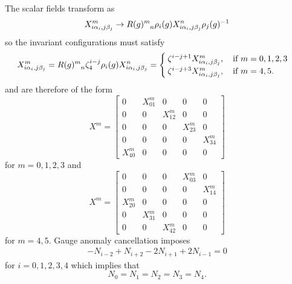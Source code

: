             The scalar fields transform as
            \begin{equation}
                X^m_{i\alpha_i,j\beta_j}\to R(g)\indices{^m_n}\rho_i(g)X^n_{i\alpha_i,j\beta_j}\rho_j(g)^{-1}
            \end{equation}
            so the invariant configurations must satisfy
            \begin{equation}
                X^m_{i\alpha_i,j\beta_j} = R(g)\indices{^m_n}\zeta^{i-j}_4\rho_i(g)X^n_{i\alpha_i,j\beta_j} = 
                \begin{cases}
                    \zeta^{i-j+1}X^m_{i\alpha_i,j\beta_j},\quad\text{if } m=0,1,2,3\\
                    \zeta^{i-j+3}X^m_{i\alpha_i,j\beta_j},\quad\text{if } m=4,5.
                \end{cases}
            \end{equation}
            and are therefore of the form
            \begin{equation}
                X^m = 
                \begin{bmatrix}
                    0 & X^m_{01} & 0 & 0 & 0\\
                    0 & 0 & X^m_{12} & 0 & 0\\
                    0 & 0 & 0 & X^m_{23} & 0\\
                    0 & 0 & 0 & 0 & X^m_{34}\\
                    X^m_{40} & 0 & 0 & 0 & 0
                \end{bmatrix}
            \end{equation}
            for $m=0,1,2,3$ and 
            \begin{equation}
                X^m = 
                \begin{bmatrix}
                    0 & 0 & 0 & X^m_{03} & 0\\
                    0 & 0 & 0 & 0 & X^m_{14}\\
                    X^m_{20} & 0 & 0 & 0 & 0\\
                    0 & X^m_{31} & 0 & 0 & 0\\
                    0 & 0 & X^m_{42} & 0 & 0
                \end{bmatrix}
            \end{equation}
            for $m=4,5$. Gauge anomaly cancellation imposes
            \begin{align}
                -N_{i-2}+N_{i+2}-2N_{i+1}+2N_{i-1}=0
            \end{align}
            for $i=0,1,2,3,4$ which implies that
            \begin{equation}
                N_0=N_1=N_2=N_3=N_4.
            \end{equation}

